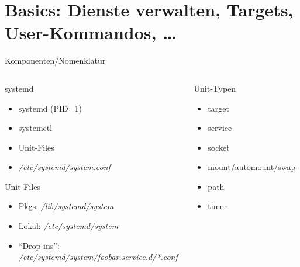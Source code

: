 \section[Basics]{Basics: Dienste verwalten, Targets, User-Kommandos, \dots}

\begin{frame}[allowframebreaks]{Komponenten/Nomenklatur}
  \begin{columns}[onlytextwidth]
    \begin{column}[t]{0.5\textwidth}
      \begin{block}{systemd}
        \begin{itemize}
          \item systemd (PID=1)
          \item systemctl
          \item Unit-Files
	  \item \emph{/etc/systemd/system.conf}
 	\end{itemize}
      \end{block}

      \begin{block}{Unit-Files}
        \begin{itemize}
	  \item Pkgs: \emph{/lib/systemd/system}
	  \item Lokal: \emph{/etc/systemd/system}
	  \item ``Drop-ins'':\\
	  \mbox{\emph{/etc/systemd/system/foobar.service.d/*.conf}}
	\end{itemize}
      \end{block}
    \end{column}

    \begin{column}[t]{0.5\textwidth}
      \begin{block}{Unit-Typen}
        \begin{itemize}
	  \item target
	  \item service
	  \item socket
	  \item mount/automount/swap
	  \item path
	  \item timer
	\end{itemize}
      \end{block}
    \end{column}
  \end{columns}


\end{frame}
